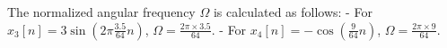 
\item[(b)]
The normalized angular frequency $\Omega$ is calculated as follows:
- For $x_{3}[n] = 3 \sin\left(2 \pi \frac{3.5}{64} n\right)$, $\Omega = \frac{2 \pi \times 3.5}{64}$.
- For $x_{4}[n] = -\cos\left(\frac{9}{64} n\right)$, $\Omega = \frac{2 \pi \times 9}{64}$.
